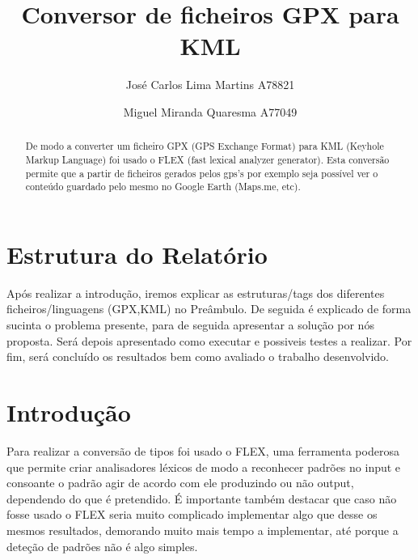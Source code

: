 \documentclass{llncs}
\begin{document}
 \mainmatter
\title{Conversor de ficheiros GPX para KML}
\author{José Carlos Lima Martins A78821 \and
        Miguel Miranda Quaresma A77049}

\maketitle

\justify

\begin{abstract}
De modo a converter um ficheiro GPX (GPS Exchange Format) para KML (Keyhole Markup Language) foi usado o FLEX (fast lexical analyzer generator). Esta conversão permite que a partir de ficheiros gerados pelos gps's por exemplo seja possível ver o conteúdo guardado pelo mesmo no Google Earth (Maps.me, etc).
\end{abstract}

\section{Estrutura do Relatório}
Após realizar a introdução, iremos explicar as estruturas/tags dos diferentes ficheiros/linguagens (GPX,KML) no Preâmbulo. De seguida é explicado de forma sucinta o problema presente, para de seguida apresentar a solução por nós proposta. Será depois apresentado como executar e possiveis testes a realizar. Por fim, será concluído os resultados bem como avaliado o trabalho desenvolvido.

\section{Introdução}
Para realizar a conversão de tipos foi usado o FLEX, uma ferramenta poderosa que permite criar analisadores léxicos de modo a reconhecer padrões no input e consoante o padrão agir de acordo com ele produzindo ou não output, dependendo do que é pretendido. É importante também destacar que caso não fosse usado o FLEX seria muito complicado implementar algo que desse os mesmos resultados, demorando muito mais tempo a implementar, até porque a deteção de padrões não é algo simples.
\end{document}
